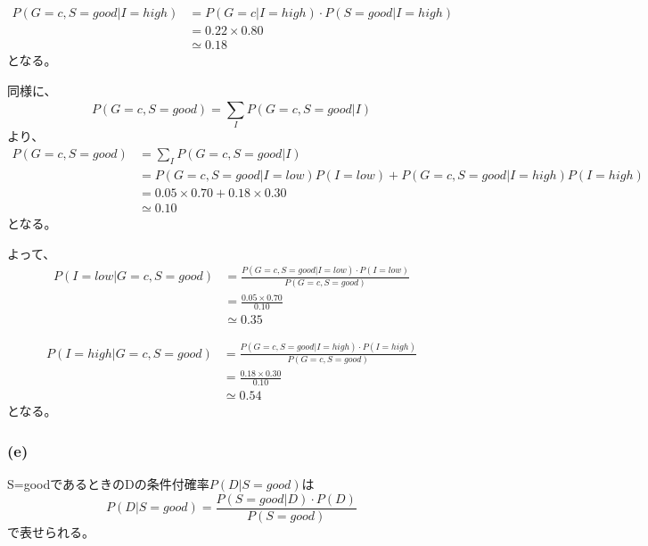 \documentclass[a4paper,11pt,dvipdfmx]{jsarticle}
\begin{document}
\begin{align*}
    P(G=c,S=good|I = high)    &= P(G=c|I = high) \cdot P(S=good|I = high)\\
                                &= 0.22 \times 0.80\\
                                &\simeq 0.18
\end{align*}
となる。

同様に、
\[P(G=c,S=good) = \sum_{I}^{}P(G=c,S=good|I)\]
より、
\begin{align*}
    P(G=c,S=good)  &= \sum_{I}^{}P(G=c,S=good|I)\\
                    &= P(G=c,S=good|I = low)P(I = low) + P(G=c,S=good|I = high)P(I = high)\\
                    &= 0.05 \times 0.70 + 0.18 \times 0.30\\
                    &\simeq 0.10
\end{align*}
となる。

よって、
\begin{align*}
    P(I = low|G=c,S=good)    &= \frac{P(G=c,S=good|I = low) \cdot P(I = low)}{P(G=c,S=good)}\\
                                &= \frac{0.05 \times 0.70}{0.10}\\
                                &\simeq 0.35
\end{align*}

\begin{align*}
    P(I = high|G=c,S=good)    &= \frac{P(G=c,S=good|I = high) \cdot P(I = high)}{P(G=c,S=good)}\\
                                &= \frac{0.18 \times 0.30}{0.10}\\
                                &\simeq 0.54
\end{align*}
となる。

\subsubsection*{(e)}
S=goodであるときのDの条件付確率$P(D|S=good)$は
\[P(D|S=good)=\frac{P(S=good|D) \cdot P(D)}{P(S=good)}\]
で表せられる。
\end{document}
